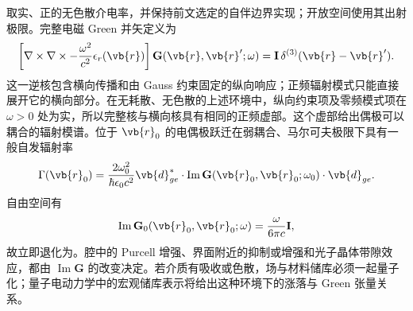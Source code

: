 取实、正的无色散介电率，并保持前文选定的自伴边界实现；开放空间使用其出射极限。完整电磁 Green 并矢定义为
\begin{equation}
\left[\nabla\times\nabla\times
-\frac{\omega^2}{c^2}\epsilon_r(\vb{r})\right]
\mathbf G(\vb{r},\vb{r}';\omega)
=\mathbf I\,\delta^{(3)}(\vb{r}-\vb{r}').
\label{eq:maxwell-green-dyadic}
\end{equation}
这一逆核包含横向传播和由 Gauss 约束固定的纵向响应；正频辐射模式只能直接展开它的横向部分。在无耗散、无色散的上述环境中，纵向约束项及零频模式项在 $\omega>0$ 处为实，所以完整核与横向核具有相同的正频虚部。这个虚部给出偶极可以耦合的辐射模谱。位于 $\vb{r}_0$ 的电偶极跃迁在弱耦合、马尔可夫极限下具有一般自发辐射率
\begin{equation}
\Gamma(\vb{r}_0)
=\frac{2\omega_0^2}{\hbar\epsilon_0c^2}
\vb{d}_{ge}^*\cdot
\operatorname{Im}\mathbf G(\vb{r}_0,\vb{r}_0;\omega_0)
\cdot\vb{d}_{ge}.
\label{eq:spontaneous-green-dyadic}
\end{equation}
自由空间有
\[
\operatorname{Im}\mathbf G_0(\vb{r}_0,\vb{r}_0;\omega)
=\frac{\omega}{6\pi c}\mathbf I,
\]
故立即退化为。腔中的 Purcell 增强、界面附近的抑制或增强和光子晶体带隙效应，都由 $\operatorname{Im}\mathbf G$ 的改变决定。若介质有吸收或色散，场与材料储库必须一起量子化；量子电动力学中的宏观储库表示将给出这种环境下的涨落与 Green 张量关系。

